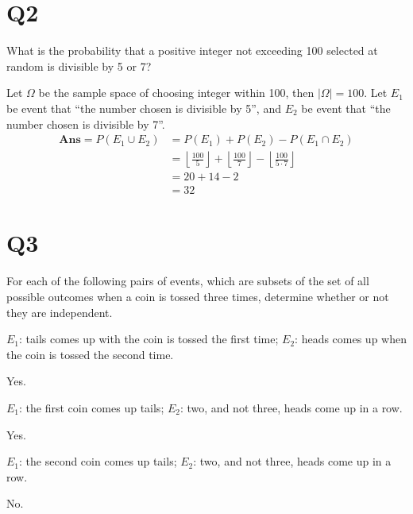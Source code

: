 \documentclass[11pt]{article}
\begin{document}
\section*{Q2}
What is the probability that a positive integer not exceeding
100 selected at random is divisible by 5 or 7?
\begin{solution}
    Let $\Omega$ be the sample space of choosing integer within 100, then 
    $\left\vert \Omega \right\vert =100$.
    Let $E_1$ be event that ``the number chosen is divisible by 5'', and 
    $E_2$ be event that ``the number chosen is divisible by 7''.
    \begin{align*}
        \textbf{Ans}=P(E_1 \cup E_2)&=P(E_1)+P(E_2)-P(E_1 \cap E_2)\\
        &=\left\lfloor \frac{100}{5} \right\rfloor+\left\lfloor \frac{100}{7} \right\rfloor
        -\left\lfloor \frac{100}{5\cdot 7} \right\rfloor\\
        &=20+14-2\\
        &=32
    \end{align*}
\end{solution}

\section*{Q3}
For each of the following pairs of events, which are subsets of
the set of all possible outcomes when a coin is tossed three
times, determine whether or not they are independent.
\begin{qparts}
    
    \item $E_1$: tails comes up with the coin is tossed the ﬁrst time; $E_2$:
    heads comes up when the coin is tossed the second time.
    \begin{solution}
        Yes.
    \end{solution}
    
    \item  $E_1$: the ﬁrst coin comes up tails; $E_2$: two, and not three, heads
    come up in a row.
    \begin{solution}
        Yes.
    \end{solution}
    
    \item  $E_1$: the second coin comes up tails; $E_2$: two, and not three,
    heads come up in a row.
    \begin{solution}
        No.
    \end{solution}
\end{qparts}
\end{document}
